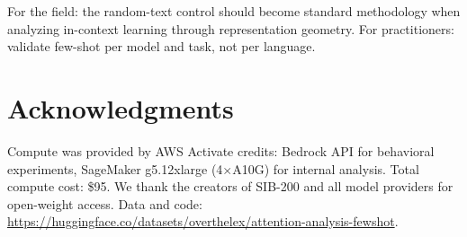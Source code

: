 \documentclass[11pt,a4paper]{article}
\begin{document}
For the field: the random-text control should become standard methodology when analyzing in-context learning through representation geometry. For practitioners: validate few-shot per model and task, not per language.

\section*{Acknowledgments}

Compute was provided by AWS Activate credits: Bedrock API for behavioral experiments, SageMaker g5.12xlarge (4$\times$A10G) for internal analysis. Total compute cost: \$95. We thank the creators of SIB-200 and all model providers for open-weight access. Data and code: \url{https://huggingface.co/datasets/overthelex/attention-analysis-fewshot}.
\end{document}

